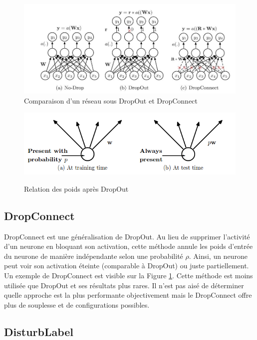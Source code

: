 \begin{figure}
\centering
        \includegraphics[scale=0.4]{./tex/regularisation/droppic.png}
    \caption{Comparaison d'un réseau sous DropOut et DropConnect}
    \label{dropoutdropco}
\end{figure}

\begin{figure}
   \centering
         \includegraphics[scale=0.4]{./tex/regularisation/drop2.png} \\
    \caption{Relation des poids après DropOut}
    \label{dropout_fig}
\end{figure}

\subsection{DropConnect}

\noindent DropConnect\cite{dropconnect_deep} est une généralisation de DropOut. Au lieu de supprimer l'activité d'un neurone en bloquant son activation, cette méthode annule les poids d'entrée du neurone de manière indépendante selon une probabilité $\rho$. Ainsi, un neurone peut voir son activation éteinte (comparable à DropOut) ou juste partiellement. Un exemple de DropConnect est visible sur la Figure \ref{dropoutdropco}. Cette méthode est moins utilisée que DropOut et ses résultats plus rares. Il n'est pas aisé de déterminer quelle approche est la plus performante objectivement mais le DropConnect offre plus de souplesse et de configurations possibles.

\subsection{DisturbLabel}

